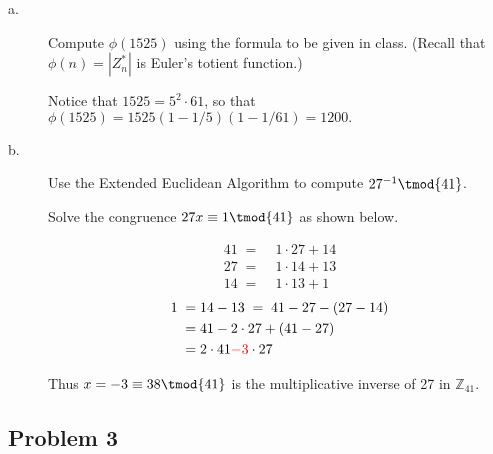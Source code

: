 \documentclass[../hw_sols.tex]{subfiles}
\begin{document}
\begin{description}

\item[a.] Compute $\phi(1525)$ using the formula to be given in class. (Recall 
that $\phi(n) = |Z^*_n|$ is Euler's totient function.)

\begin{solution}
Notice that $1525 = 5^2 \cdot 61$, so that 
$\phi(1525) = 1525(1 - 1/5)(1 - 1/61) = 1200.$
\end{solution}


\item[b.] Use the Extended Euclidean Algorithm to compute $27^{-1} \tmod{41}$.

\begin{solution}

Solve the congruence $27x \equiv 1 \tmod{41}$ as shown below.

\begin{multicols}{2}
\noindent
	\begin{align*}
		41 \; =& \; 1 \cdot 27 + 14 \\
		27 \; =& \; 1 \cdot 14 + 13 \\
		14 \; =& \; 1 \cdot 13 + 1
	\end{align*}
	\begin{align*}
		1 \; =& \; 14 - 13 \; = \; 41 - 27 - (27 - 14) \\
		=& \; 41 - 2 \cdot 27 + (41 - 27) \\
		=& \; 2 \cdot 41 {\color{red}- 3} \cdot 27
	\end{align*}
\end{multicols}

Thus $x = -3 \equiv 38 \tmod{41}$ is the multiplicative inverse of 27 in 
$\mathbb{Z}_{41}$.

\end{solution}

\end{description}


\newpage



\subsection*{Problem 3}
\end{document}
